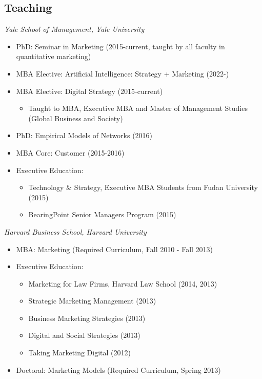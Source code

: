 \documentclass[margin, line, centered, 10pt]{res}
\begin{document}
\begin{resume}
%


\section{\sc Teaching}
\textit{Yale School of Management, Yale University}
\begin{itemize}
\item PhD: Seminar in Marketing (2015-current, taught by all faculty in quantitative marketing)
\item MBA Elective: Artificial Intelligence: Strategy + Marketing (2022-)
\item MBA Elective: Digital Strategy (2015-current)
\begin{itemize}
\item Taught to MBA, Executive MBA and Master of Management Studies (Global Business and Society)
\end{itemize}
\item PhD: Empirical Models of Networks (2016)
\item MBA Core: Customer (2015-2016)
\item Executive Education:
\begin{itemize}
\item Technology \& Strategy, Executive MBA Students from Fudan University (2015)
\item BearingPoint Senior Managers Program (2015)
\end{itemize}
\end{itemize}


\textit{Harvard Business School, Harvard University}
\begin{itemize}
\item MBA: Marketing (Required Curriculum, Fall 2010 - Fall 2013)
\item Executive Education:
\begin{itemize}
\item Marketing for Law Firms, Harvard Law School (2014, 2013)
\item Strategic Marketing Management  (2013)
\item Business Marketing Strategies (2013)
\item Digital and Social Strategies (2013)
\item Taking Marketing Digital (2012)
\end{itemize}
\item Doctoral: Marketing Models (Required Curriculum, Spring 2013)
\end{itemize}


\end{resume}
\end{document}
